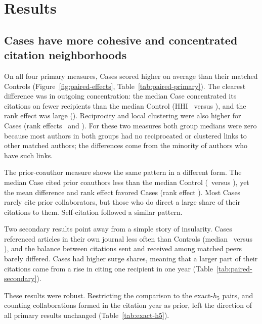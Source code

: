 \documentclass[12pt]{article}
\begin{document}
\section{Results}
\label{sec:results}

\subsection{Cases have more cohesive and concentrated citation neighborhoods}
\label{sec:paired-results}

On all four primary measures, Cases scored higher on average than their matched Controls (Figure~\ref{fig:paired-effects}, Table~\ref{tab:paired-primary}).  The clearest difference was in outgoing concentration: the median Case concentrated its citations on fewer recipients than the median Control (HHI \PrimaryOutgoingHhiCaseMedian\ versus \PrimaryOutgoingHhiControlMedian), and the rank effect was large (\PrimaryOutgoingHhiRankBiserial).  Reciprocity and local clustering were also higher for Cases (rank effects \PrimaryReciprocityRankBiserial\ and \PrimaryLocalClusteringRankBiserial).  For these two measures both group medians were zero because most authors in both groups had no reciprocated or clustered links to other matched authors; the differences come from the minority of authors who have such links.

The prior-coauthor measure shows the same pattern in a different form.  The median Case cited prior coauthors less than the median Control (\PrimaryCoauthorCitationRateCaseMedian\ versus \PrimaryCoauthorCitationRateControlMedian), yet the mean difference and rank effect favored Cases (rank effect \PrimaryCoauthorCitationRateRankBiserial).  Most Cases rarely cite prior collaborators, but those who do direct a large share of their citations to them.  Self-citation followed a similar pattern.

Two secondary results point away from a simple story of insularity.  Cases referenced articles in their own journal less often than Controls (median \SecondaryJournalEndogamyCaseMedian\ versus \SecondaryJournalEndogamyControlMedian), and the balance between citations sent and received among matched peers barely differed.  Cases had higher surge shares, meaning that a larger part of their citations came from a rise in citing one recipient in one year (Table~\ref{tab:paired-secondary}).

These results were robust.  Restricting the comparison to the exact-$h_5$ pairs, and counting collaborations formed in the citation year as prior, left the direction of all primary results unchanged (Table~\ref{tab:exact-h5}).
\end{document}
